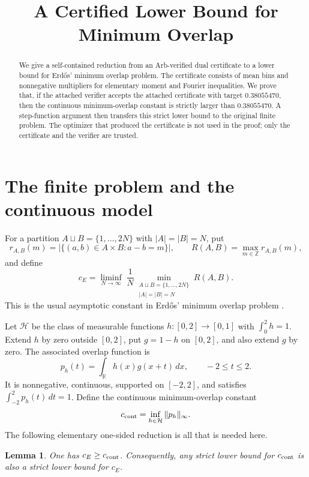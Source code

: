 \documentclass[a4paper]{amsart}
\title{A Certified Lower Bound for Minimum Overlap}
\date{}
\newtheorem{lemma}[theorem]{Lemma}
\newcommand{\R}{\mathbb R}
\newcommand{\Z}{\mathbb Z}
\newcommand{\dd}{\,d}
\begin{document}
\begin{abstract}
We give a self-contained reduction from an Arb-verified dual certificate to a lower bound for Erd\H{o}s' minimum overlap problem.  The certificate consists of mean bins and nonnegative multipliers for elementary moment and Fourier inequalities.  We prove that, if the attached verifier accepts the attached certificate with target $0.38055470$, then the continuous minimum-overlap constant is strictly larger than $0.38055470$.  A step-function argument then transfers this strict lower bound to the original finite problem.  The optimizer that produced the certificate is not used in the proof; only the certificate and the verifier are trusted.
\end{abstract}

\maketitle

\section{The finite problem and the continuous model}

For a partition $A\sqcup B=\{1,\ldots,2N\}$ with $|A|=|B|=N$, put
\[
 r_{A,B}(m)=|\{(a,b)\in A\times B:a-b=m\}|,\qquad R(A,B)=\max_{m\in\Z} r_{A,B}(m),
\]
and define
\[
 c_E=\liminf_{N\to\infty}\;\frac{1}{N}\min_{\substack{A\sqcup B=\{1,\ldots,2N\}\\ |A|=|B|=N}} R(A,B).
\]
This is the usual asymptotic constant in Erd\H{o}s' minimum overlap problem \cite{Erdos1956,Haugland2016,White2022}.

Let $\mathcal H$ be the class of measurable functions $h:[0,2]\to[0,1]$ with $\int_0^2 h=1$.  Extend $h$ by zero outside $[0,2]$, put $g=1-h$ on $[0,2]$, and also extend $g$ by zero.  The associated overlap function is
\[
 p_h(t)=\int_\R h(x)g(x+t)\dd x,\qquad -2\le t\le 2.
\]
It is nonnegative, continuous, supported on $[-2,2]$, and satisfies $\int_{-2}^2 p_h(t)\dd t=1$.  Define the continuous minimum-overlap constant
\[
 c_{\rm cont}=\inf_{h\in\mathcal H}\|p_h\|_\infty .
\]
The following elementary one-sided reduction is all that is needed here.

\begin{lemma}\label{lem:discrete-continuous}
One has $c_E\ge c_{\rm cont}$.  Consequently, any strict lower bound for $c_{\rm cont}$ is also a strict lower bound for $c_E$.
\end{lemma}
\end{document}
